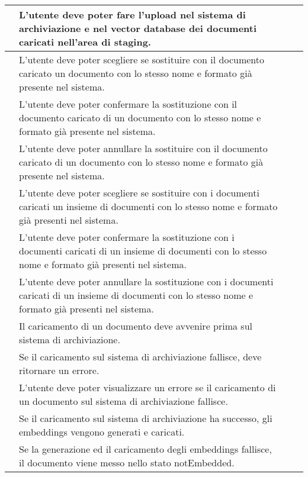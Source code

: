 \documentclass[10pt, a4paper]{article}
\begin{document}
\begin{xltabular}{\textwidth}{|c|X|c|c}
\hline {} & L'utente deve poter fare l'upload nel sistema di archiviazione e nel vector database dei documenti caricati nell'area di staging. &  \\
\hline {} & L'utente deve poter scegliere se sostituire con il documento caricato un documento con lo stesso nome e formato già presente nel sistema. &  \\
\hline {} & L'utente deve poter confermare la sostituzione con il documento caricato di un documento con lo stesso nome e formato già presente nel sistema. &  \\
\hline {} & L'utente deve poter annullare la sostituire con il documento caricato di un documento con lo stesso nome e formato già presente nel sistema. &  \\
\hline {} & L'utente deve poter scegliere se sostituire con i documenti caricati un insieme di documenti con lo stesso nome e formato già presenti nel sistema. &  \\
\hline {} & L'utente deve poter confermare la sostituzione con i documenti caricati di un insieme di documenti con lo stesso nome e formato già presenti nel sistema. &  \\
\hline {} & L'utente deve poter annullare la sostituzione con i documenti caricati di un insieme di documenti con lo stesso nome e formato già presenti nel sistema. &  \\

\hline {} & Il caricamento di un documento deve avvenire prima sul sistema di archiviazione. &  \\
\hline {} & Se il caricamento sul sistema di archiviazione fallisce, deve ritornare un errore. &  \\
\hline {} & L'utente deve poter visualizzare un errore se il caricamento di un documento sul sistema di archiviazione fallisce. &  \\
\hline {} & Se il caricamento sul sistema di archiviazione ha successo, gli embeddings vengono generati e caricati. &  \\
\hline {} & Se la generazione ed il caricamento degli embeddings fallisce, il documento viene messo nello stato notEmbedded. &  \\


\end{xltabular}
\end{document}
